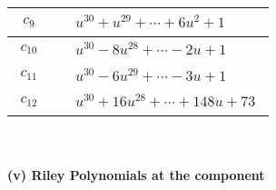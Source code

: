 \documentclass[1p]{elsarticle_modified}
\theoremstyle{definition}
\begin{document}
\begin{tabular}{m{50pt}|m{274pt}}
\hline $$\begin{aligned}c_{9}\end{aligned}$$&$\begin{aligned}
&u^{30}+u^{29}+\cdots+6 u^2+1
\end{aligned}$\\
\hline $$\begin{aligned}c_{10}\end{aligned}$$&$\begin{aligned}
&u^{30}-8 u^{28}+\cdots-2 u+1
\end{aligned}$\\
\hline $$\begin{aligned}c_{11}\end{aligned}$$&$\begin{aligned}
&u^{30}-6 u^{29}+\cdots-3 u+1
\end{aligned}$\\
\hline $$\begin{aligned}c_{12}\end{aligned}$$&$\begin{aligned}
&u^{30}+16 u^{28}+\cdots+148 u+73
\end{aligned}$\\
\hline
\end{tabular}\\~\\
\newpage\renewcommand{\arraystretch}{1}
\flushleft \textbf{(v) Riley Polynomials at the component}\newline \\
\end{document}
